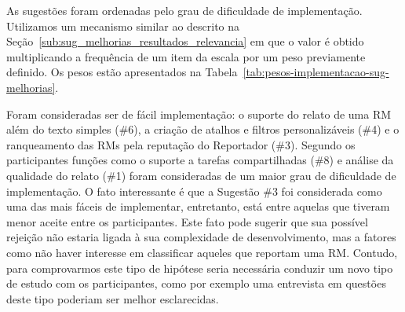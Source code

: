 As sugestões foram ordenadas pelo grau de dificuldade de implementação.
Utilizamos um mecanismo similar ao descrito na
Seção~\ref{sub:sug_melhorias_resultados_relevancia} em que o valor é obtido
multiplicando a frequência de um item da escala por um peso previamente
definido. Os pesos estão apresentados na
Tabela~\ref{tab:pesos-implementacao-sug-melhorias}.

\begin{table}[htpb]
\centering
{}
\caption{Pesos utilizados no ranqueamento das sugestões de melhorias}\label{tab:pesos-implementacao-sug-melhorias}
\end{table}

Foram consideradas ser de fácil implementação: o suporte do relato de uma RM
além do texto simples (\#6), a criação de atalhos e filtros personalizáveis
(\#4) e o ranqueamento das RMs pela reputação do Reportador (\#3). Segundo os
participantes funções como o suporte a tarefas compartilhadas (\#8) e análise
da qualidade do relato (\#1) foram consideradas de um maior grau de dificuldade
de implementação. O fato interessante é que a Sugestão \#3 foi considerada como
uma das mais fáceis de implementar, entretanto, está entre aquelas que tiveram
menor aceite entre os participantes. Este fato pode sugerir que sua possível
rejeição não estaria ligada à sua complexidade de desenvolvimento, mas a
fatores como não haver interesse em classificar aqueles que reportam uma RM\@.
Contudo, para comprovarmos este tipo de hipótese seria necessária conduzir um
novo tipo de estudo com os participantes, como por exemplo uma entrevista em
questões deste tipo poderiam ser melhor esclarecidas.


